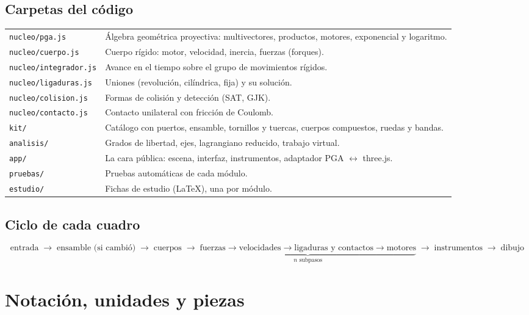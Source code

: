 \documentclass[11pt,a4paper]{article}
\numberwithin{equation}{section}
\begin{document}
\subsection{Carpetas del código}
\begin{tabularx}{\linewidth}{@{}l Y@{}}
\toprule
\texttt{nucleo/pga.js} & Álgebra geométrica proyectiva: multivectores, productos, motores, exponencial y logaritmo.\\
\texttt{nucleo/cuerpo.js} & Cuerpo rígido: motor, velocidad, inercia, fuerzas (forques).\\
\texttt{nucleo/integrador.js} & Avance en el tiempo sobre el grupo de movimientos rígidos.\\
\texttt{nucleo/ligaduras.js} & Uniones (revolución, cilíndrica, fija) y su solución.\\
\texttt{nucleo/colision.js} & Formas de colisión y detección (SAT, GJK).\\
\texttt{nucleo/contacto.js} & Contacto unilateral con fricción de Coulomb.\\
\texttt{kit/} & Catálogo con puertos, ensamble, tornillos y tuercas, cuerpos compuestos, ruedas y bandas.\\
\texttt{analisis/} & Grados de libertad, ejes, lagrangiano reducido, trabajo virtual.\\
\texttt{app/} & La cara pública: escena, interfaz, instrumentos, adaptador PGA $\leftrightarrow$ three.js.\\
\texttt{pruebas/} & Pruebas automáticas de cada módulo.\\
\texttt{estudio/} & Fichas de estudio (LaTeX), una por módulo.\\
\bottomrule
\end{tabularx}

\subsection{Ciclo de cada cuadro}
\begin{equation*}
\text{entrada} \;\to\; \text{ensamble (si cambió)} \;\to\; \text{cuerpos} \;\to\;
\underbrace{\text{fuerzas} \to \text{velocidades} \to \text{ligaduras y contactos} \to \text{motores}}_{n \text{ subpasos}} \;\to\; \text{instrumentos} \;\to\; \text{dibujo}
\end{equation*}

\section{Notación, unidades y piezas}
\end{document}
